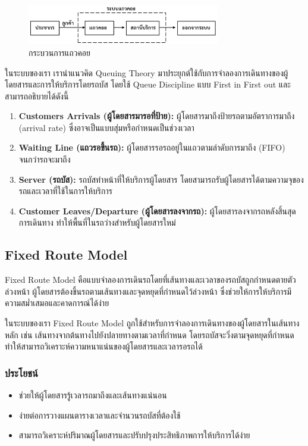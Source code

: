 \begin{figure}[h]
    \centering
    \includegraphics[width=0.75\textwidth]{Query_theory.png}
    \caption{กระบวนการแถวคอย}
    \label{fig:example}
\end{figure}
\indent ในระบบของเรา เรานำแนวคิด Queuing Theory มาประยุกต์ใช้กับการจำลองการเดินทางของผู้โดยสารและการให้บริการโดยรถบัส โดยใช้ Queue Discipline แบบ First in First out และสามารถอธิบายได้ดังนี้
\begin{enumerate}
    \item \textbf{Customers Arrivals (ผู้โดยสารมารอที่ป้าย):} ผู้โดยสารมาถึงป้ายรถตามอัตราการมาถึง (arrival rate) ซึ่งอาจเป็นแบบสุ่มหรือกำหนดเป็นช่วงเวลา
    \item \textbf{Waiting Line (แถวรอขึ้นรถ):} ผู้โดยสารรอรถอยู่ในแถวตามลำดับการมาถึง (FIFO) จนกว่ารถจะมาถึง
    \item \textbf{Server (รถบัส):} รถบัสทำหน้าที่ให้บริการผู้โดยสาร โดยสามารถรับผู้โดยสารได้ตามความจุของรถและเวลาที่ใช้ในการให้บริการ
    \item \textbf{Customer Leaves/Departure (ผู้โดยสารลงจากรถ):} ผู้โดยสารลงจากรถหลังสิ้นสุดการเดินทาง ทำให้พื้นที่ในรถว่างสำหรับผู้โดยสารใหม่
\end{enumerate}

\subsection{Fixed Route Model}
Fixed Route Model คือแบบจำลองการเดินรถโดยที่เส้นทางและเวลาของรถบัสถูกกำหนดตายตัวล่วงหน้า ผู้โดยสารต้องขึ้นรถตามเส้นทางและจุดหยุดที่กำหนดไว้ล่วงหน้า ซึ่งช่วยให้การให้บริการมีความสม่ำเสมอและคาดการณ์ได้ง่าย

\indent ในระบบของเรา Fixed Route Model ถูกใช้สำหรับการจำลองการเดินทางของผู้โดยสารในเส้นทางหลัก เช่น เส้นทางจากต้นทางไปยังปลายทางตามเวลาที่กำหนด โดยรถบัสจะวิ่งตามจุดหยุดที่กำหนด 
ทำให้สามารถวิเคราะห์ความหนาแน่นของผู้โดยสารและเวลารอรถได้

\subsubsection{ประโยชน์}
\begin{itemize}
  \item ช่วยให้ผู้โดยสารรู้เวลารถมาถึงและเส้นทางแน่นอน
  \item ง่ายต่อการวางแผนตารางเวลาและจำนวนรถบัสที่ต้องใช้
  \item สามารถวิเคราะห์ปริมาณผู้โดยสารและปรับปรุงประสิทธิภาพการให้บริการได้ง่าย
\end{itemize}